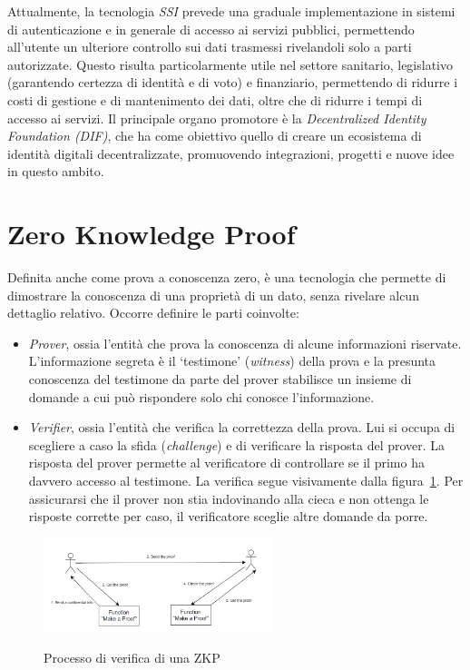 Attualmente, la tecnologia \textit{SSI} prevede una graduale implementazione in sistemi di autenticazione e
in generale di accesso ai servizi pubblici, permettendo all'utente un ulteriore controllo
sui dati trasmessi rivelandoli solo a parti autorizzate.
Questo risulta particolarmente utile nel settore sanitario, legislativo (garantendo certezza di identità e di voto) e finanziario,
permettendo di ridurre i costi di gestione e di mantenimento dei dati, oltre che di ridurre i tempi di accesso ai servizi.
Il principale organo promotore è la \textit{Decentralized Identity Foundation (DIF)}, che ha come obiettivo quello di creare
un ecosistema di identità digitali decentralizzate, promuovendo integrazioni, progetti e nuove idee in questo ambito. 

\section{Zero Knowledge Proof}\label{sec:zero-knowledge-proof}
Definita anche come prova a conoscenza zero, è una tecnologia che permette di dimostrare la conoscenza di una proprietà di un dato,
senza rivelare alcun dettaglio relativo.
Occorre definire le parti coinvolte:
\begin{itemize}
    \item \textit{Prover}, ossia l'entità che prova la conoscenza di alcune informazioni riservate. 
    L'informazione segreta è il `testimone' (\textit{witness}) della prova e la presunta conoscenza del testimone da parte del prover stabilisce un insieme di domande a cui può rispondere solo chi conosce l'informazione. 
    \item \textit{Verifier}, ossia l'entità che verifica la correttezza della prova. Lui si occupa di scegliere a caso la sfida (\textit{challenge}) e di verificare la risposta del prover.
    La risposta del prover permette al verificatore di controllare se il primo ha davvero accesso al testimone. La verifica segue visivamente dalla figura~\ref{fig:zkp}. 
    Per assicurarsi che il prover non stia indovinando alla cieca e non ottenga le risposte corrette per caso, il verificatore sceglie altre domande da porre.
\end{itemize}

\begin{figure}[ht] 
    \centering
    \includegraphics[width=0.6\textwidth, alt={Come funziona la verifica nella ZKP}]{immagini/zkp.png}
    \caption{Processo di verifica di una ZKP}\label{fig:zkp}
\end{figure}

